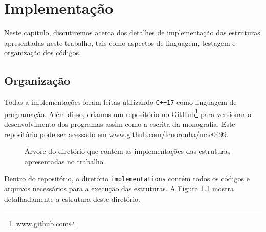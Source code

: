 
\chapter{Implementação}
\label{cap:implementacao}

Neste capítulo, discutiremos acerca dos detalhes de implementação das estruturas apresentadas neste trabalho, tais como aspectos de linguagem, testagem e organização dos códigos.

\section{Organização}

Todas a implementações foram feitas utilizando \texttt{C++17} como linguagem de programação. Além disso, criamos um repositório no GitHub\footnote{\url{www.github.com}} para versionar o desenvolvimento dos programas assim como a escrita da monografia. Este repositório pode ser acessado em \url{www.github.com/fcnoronha/mac0499}.

\begin{figure}[h!]
    \centering
    \caption{Árvore do diretório que contém as implementações das estruturas apresentadas no trabalho.}
    \label{fig:rep-tree}
\end{figure}


Dentro do repositório, o diretório \texttt{implementations} contém todos os códigos e arquivos necessários para a execução das estruturas. A Figura \ref{fig:rep-tree} mostra detalhadamente a estrutura deste diretório.

